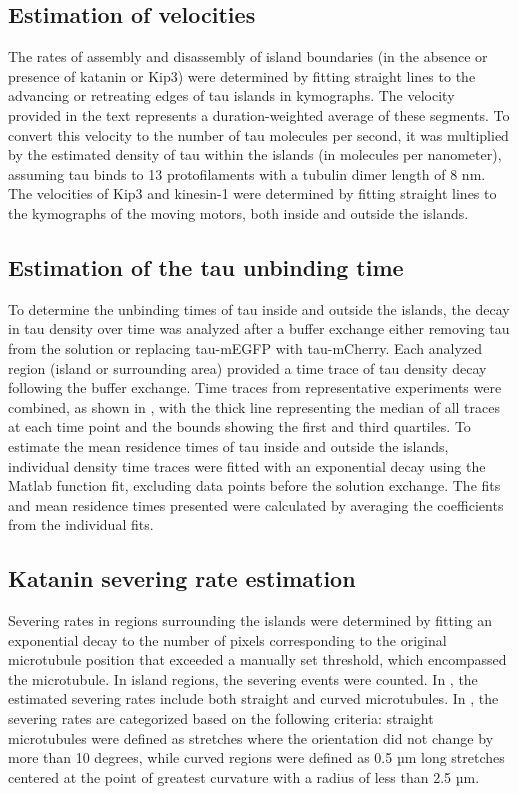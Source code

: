\subsection{Estimation of velocities}
The rates of assembly and disassembly of island boundaries (in the absence or presence of katanin or Kip3) were determined by fitting straight lines to the advancing or retreating edges of tau islands in kymographs. The velocity provided in the text represents a duration-weighted average of these segments. To convert this velocity to the number of tau molecules per second, it was multiplied by the estimated density of tau within the islands (in molecules per nanometer), assuming tau binds to 13 protofilaments with a tubulin dimer length of 8 nm. The velocities of Kip3 and kinesin-1 were determined by fitting straight lines to the kymographs of the moving motors, both inside and outside the islands.

\subsection{Estimation of the tau unbinding time}
To determine the unbinding times of tau inside and outside the islands, the decay in tau density over time was analyzed after a buffer exchange either removing tau from the solution or replacing tau-mEGFP with tau-mCherry. Each analyzed region (island or surrounding area) provided a time trace of tau density decay following the buffer exchange. Time traces from representative experiments were combined, as shown in , with the thick line representing the median of all traces at each time point and the bounds showing the first and third quartiles. To estimate the mean residence times of tau inside and outside the islands, individual density time traces were fitted with an exponential decay using the Matlab function fit, excluding data points before the solution exchange. The fits and mean residence times presented were calculated by averaging the coefficients from the individual fits.

\subsection{Katanin severing rate estimation}
Severing rates in regions surrounding the islands were determined by fitting an exponential decay to the number of pixels corresponding to the original microtubule position that exceeded a manually set threshold, which encompassed the microtubule. In island regions, the severing events were counted. In , the estimated severing rates include both straight and curved microtubules. In , the severing rates are categorized based on the following criteria: straight microtubules were defined as stretches where the orientation did not change by more than 10 degrees, while curved regions were defined as 0.5 µm long stretches centered at the point of greatest curvature with a radius of less than 2.5 µm.

